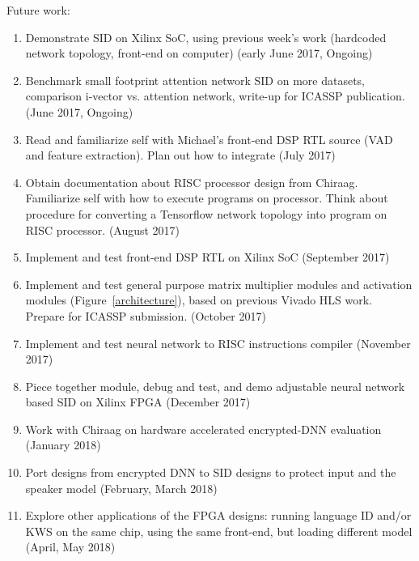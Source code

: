 \documentclass[journal,12pt,onecolumn,draftclsnofoot,]{sty/IEEEtran}
\begin{document}
Future work:
\begin{enumerate}
\item Demonstrate SID on Xilinx SoC, using previous week’s work (hardcoded network topology, front-end on computer) (early June 2017, Ongoing)
\item Benchmark small footprint attention network SID on more datasets, comparison i-vector vs. attention network, write-up for ICASSP publication.  (June 2017, Ongoing)
\item Read and familiarize self with Michael’s front-end DSP RTL source (VAD and feature extraction). Plan out how to integrate (July 2017)
\item Obtain documentation about RISC processor design from Chiraag. Familiarize self with how to execute programs on processor. Think about procedure for converting a Tensorflow network topology into program on RISC processor. (August 2017)
\item Implement and test front-end DSP RTL on Xilinx SoC (September 2017)
\item Implement and test general purpose matrix multiplier modules and activation modules (Figure~\ref{architecture}), based on previous Vivado HLS work. Prepare for ICASSP submission. (October 2017)
\item Implement and test neural network to RISC instructions compiler (November 2017)
\item Piece together module, debug and test, and demo adjustable neural network based SID on Xilinx FPGA (December 2017)
\item Work with Chiraag on hardware accelerated encrypted-DNN evaluation (January 2018)
\item Port designs from encrypted DNN to SID designs to protect input and the speaker model (February, March 2018)
\item Explore other applications of the FPGA designs: running language ID and/or KWS on the same chip, using the same front-end, but loading different model (April, May 2018)
\end{enumerate}

\newpage



\end{document}
